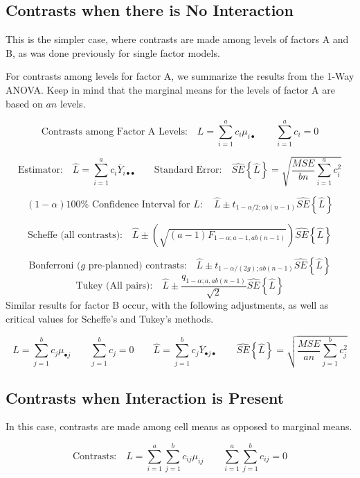 \documentclass[
]{book}
\begin{document}
\subsection{Contrasts when there is No
Interaction}\label{contrasts-when-there-is-no-interaction}

This is the simpler case, where contrasts are made among levels of
factors A and B, as was done previously for single factor models.

For contrasts among levels for factor A, we summarize the results from
the 1-Way ANOVA. Keep in mind that the marginal means for the levels of
factor A are based on \(an\) levels.

\[
\mbox{Contrasts among Factor A Levels:} \quad
L=\sum_{i=1}^a c_i\mu_{i\bullet} \qquad
\sum_{i=1}^a c_i=0
\]

\[
\mbox{Estimator:} \quad
\hat{L}=\sum_{i=1}^a c_i\overline{Y}_{i\bullet\bullet} \qquad
\mbox{Standard Error:} \quad
\hat{SE}\left\{\hat{L}\right\}=\sqrt{\frac{MSE}{bn}\sum_{i=1}^a c_i^2}
\]

\[
(1-\alpha)100\% \mbox{ Confidence Interval for }L: \quad
\hat{L} \pm t_{1-\alpha/2; ab(n-1)} \hat{SE}\left\{\hat{L}\right\}
\]

\[
\mbox{Scheffe (all contrasts):}\quad
\hat{L} \pm \left(\sqrt{(a-1)F_{1-\alpha;a-1,ab(n-1)}}\right)
\hat{SE}\left\{\hat{L}\right\}
\]

\[
\mbox{Bonferroni (} g \mbox{ pre-planned) contrasts:} \quad
\hat{L} \pm t_{1-\alpha/(2g); ab(n-1)} \hat{SE}\left\{\hat{L}\right\}
\] \[
\mbox{Tukey (All pairs):} \quad
\hat{L} \pm \frac{q_{1-\alpha; a, ab(n-1)}}{\sqrt{2}} \hat{SE}\left\{\hat{L}\right\}
\] Similar results for factor B occur, with the following adjustments,
as well as critical values for Scheffe's and Tukey's methods.

\[
L=\sum_{j=1}^b c_j\mu_{\bullet j} \qquad
\sum_{j=1}^b c_j=0  \qquad
\hat{L}=\sum_{j=1}^b c_j\overline{Y}_{\bullet j \bullet} \qquad
\hat{SE}\left\{\hat{L}\right\}=\sqrt{\frac{MSE}{an}\sum_{j=1}^b c_j^2}
\]

\subsection{Contrasts when Interaction is
Present}\label{contrasts-when-interaction-is-present}

In this case, contrasts are made among cell means as opposed to marginal
means.

\[
\mbox{Contrasts:} \quad L=\sum_{i=1}^a\sum_{j=1}^bc_{ij}\mu_{ij} \qquad
\sum_{i=1}^a\sum_{j=1}^bc_{ij}=0
\]
\end{document}
